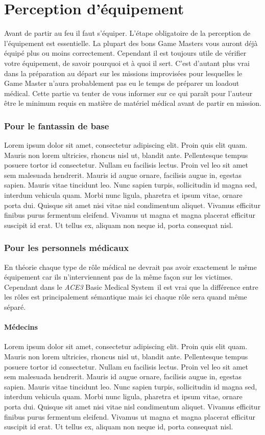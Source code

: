 \documentclass{article}
\newcommand{\medsys}{\emph{ACE3} Basic Medical System}
\begin{document}
		
		
	\part{Perception d'équipement}
		Avant de partir au feu il faut s'équiper. L'étape obligatoire de la perception de l'équipement est essentielle. La plupart des bons Game Masters vous auront déjà équipé plus ou moins correctement. Cependant il est toujours utile de vérifier votre équipement, de savoir pourquoi et à quoi il sert. C'est d'autant plus vrai dans la préparation au départ sur les missions improvisées pour lesquelles le Game Master n'aura probablement pas eu le temps de préparer un loadout médical. Cette partie va tenter de vous informer sur ce qui paraît pour l'auteur être le minimum requis en matière de matériel médical avant de partir en mission.
		
		\section{Pour le fantassin de base}
			Lorem ipsum dolor sit amet, consectetur adipiscing elit. Proin quis elit quam. Mauris non lorem ultricies, rhoncus nisl ut, blandit ante. Pellentesque tempus posuere tortor id consectetur. Nullam eu facilisis lectus. Proin vel leo sit amet sem malesuada hendrerit. Mauris id augue ornare, facilisis augue in, egestas sapien. Mauris vitae tincidunt leo. Nunc sapien turpis, sollicitudin id magna sed, interdum vehicula quam. Morbi nunc ligula, pharetra et ipsum vitae, ornare porta dui. Quisque sit amet nisi vitae nisl condimentum aliquet. Vivamus efficitur finibus purus fermentum eleifend. Vivamus ut magna et magna placerat efficitur suscipit id erat. Ut tellus ex, aliquam non neque id, porta consequat nisl.
			
		\section{Pour les personnels médicaux}
			En théorie chaque type de rôle médical ne devrait pas avoir exactement le même équipement car ils n'interviennent pas de la même façon sur les victimes. Cependant dans le \medsys\ il est vrai que la différence entre les rôles est principalement sémantique mais ici chaque rôle sera quand même séparé.
		
			\subsection{Médecins}
				Lorem ipsum dolor sit amet, consectetur adipiscing elit. Proin quis elit quam. Mauris non lorem ultricies, rhoncus nisl ut, blandit ante. Pellentesque tempus posuere tortor id consectetur. Nullam eu facilisis lectus. Proin vel leo sit amet sem malesuada hendrerit. Mauris id augue ornare, facilisis augue in, egestas sapien. Mauris vitae tincidunt leo. Nunc sapien turpis, sollicitudin id magna sed, interdum vehicula quam. Morbi nunc ligula, pharetra et ipsum vitae, ornare porta dui. Quisque sit amet nisi vitae nisl condimentum aliquet. Vivamus efficitur finibus purus fermentum eleifend. Vivamus ut magna et magna placerat efficitur suscipit id erat. Ut tellus ex, aliquam non neque id, porta consequat nisl.
				
\end{document}

